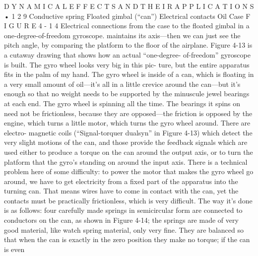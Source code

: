 \documentclass[10pt,oneside]{article}
\begin{document}
D Y N A M I C A L  E F F E C T S  A N D  T H E I R  A P P L I C A T I O N S • 1 2 9 Conductive spring Floated gimbal (“can”) Electrical contacts Oil Case F I G U R E  4 - 1 4 Electrical connections from the case to the floated gimbal in a one-degree-of-freedom gyroscope. maintains its axis---then we can just see the pitch angle, by comparing the platform to the floor of the airplane. Figure 4-13 is a cutaway drawing that shows how an actual “one-degree- of-freedom” gyroscope is built. The gyro wheel looks very big in this pic- ture, but the entire apparatus fits in the palm of my hand. The gyro wheel is inside of a can, which is floating in a very small amount of oil---it’s all in a little crevice around the can---but it’s enough so that no weight needs to be supported by the minuscule jewel bearings at each end. The gyro wheel is spinning all the time. The bearings it spins on need not be frictionless, because they are opposed---the friction is opposed by the engine, which turns a little motor, which turns the gyro wheel around. There are electro- magnetic coils (“Signal-torquer dualsyn” in Figure 4-13) which detect the very slight motions of the can, and those provide the feedback signals which are used either to produce a torque on the can around the output axis, or to turn the platform that the gyro’s standing on around the input axis. There is a technical problem here of some difficulty: to power the motor that makes the gyro wheel go around, we have to get electricity from a fixed part of the apparatus into the turning can. That means wires have to come in contact with the can, yet the contacts must be practically frictionless, which is very difficult. The way it’s done is as follows: four carefully made springs in semicircular form are connected to conductors on the can, as shown in Figure 4-14; the springs are made of very good material, like watch spring material, only very fine. They are balanced so that when the can is exactly in the zero position they make no torque; if the can is even\par
\end{document}
